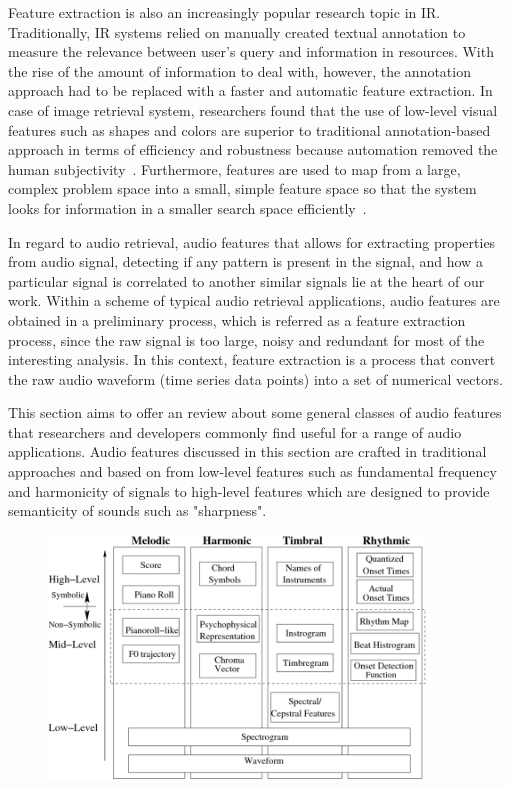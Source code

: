 Feature extraction is also an increasingly popular research topic in IR. Traditionally, IR systems relied on manually created textual annotation to measure the relevance between user's query and information in resources. With the rise of the amount of information to deal with, however, the annotation approach had to be replaced with a faster and automatic feature extraction. In case of image retrieval system, researchers found that the use of low-level visual features such as shapes and colors are superior to traditional annotation-based approach in terms of efficiency and robustness because automation removed the human subjectivity~\cite{jalal2016}.
 Furthermore, features are used to map from a large, complex problem space into a small, simple feature space so that the system looks for information in a smaller search space efficiently~\cite{dragos2000}. 

 In regard to audio retrieval, audio features that allows for extracting properties from audio signal, detecting if any pattern is present in the signal, and how a particular signal is correlated to another similar signals lie at the heart of our work.  Within a scheme of typical audio retrieval applications, audio features are obtained in a preliminary process, which is referred as a feature extraction process, since the raw signal is too large, noisy and redundant for most of the interesting analysis. In this context, feature extraction is a process that convert the raw audio waveform (time series data points) into a set of numerical vectors.  

This section aims to offer an review about some general classes of audio features that researchers and developers commonly find useful for a range of audio applications. Audio features discussed in this section are crafted in traditional approaches and based on from low-level features such as fundamental frequency and harmonicity of signals to high-level features which are designed to provide semanticity of sounds  such as "sharpness". 


\begin{figure}[htb]
	\centering
	\includegraphics[width=10cm]{Figures/low-to-high-features.png}
	\caption{}
	\label{low-to-high}
\end{figure}

